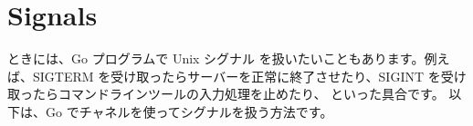 \section{Signals}

ときには、Go プログラムで Unix シグナル を扱いたいこともあります。例えば、SIGTERM を受け取ったらサーバーを正常に終了させたり、SIGINT を受け取ったらコマンドラインツールの入力処理を止めたり、 といった具合です。 以下は、Go でチャネルを使ってシグナルを扱う方法です。




